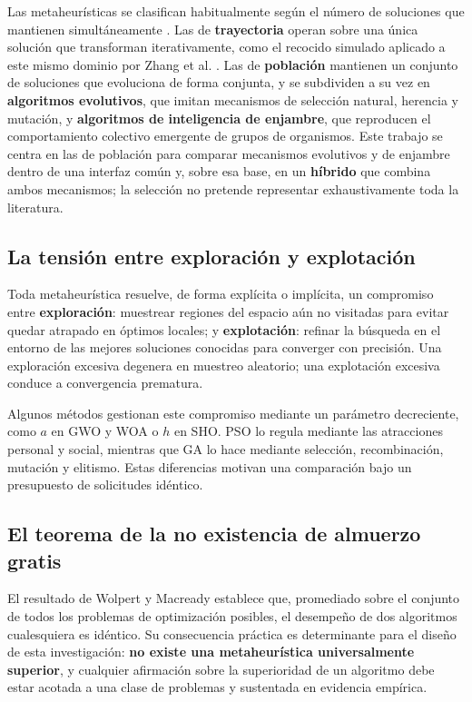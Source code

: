 Las metaheurísticas se clasifican habitualmente según el número de soluciones que mantienen simultáneamente \cite{Blum2003Overview,Talbi2009Metaheuristics}. Las de \textbf{trayectoria} operan sobre una única solución que transforman iterativamente, como el recocido simulado aplicado a este mismo dominio por Zhang et al. \cite{Zhang2018SA}. Las de \textbf{población} mantienen un conjunto de soluciones que evoluciona de forma conjunta, y se subdividen a su vez en \textbf{algoritmos evolutivos}, que imitan mecanismos de selección natural, herencia y mutación, y \textbf{algoritmos de inteligencia de enjambre}, que reproducen el comportamiento colectivo emergente de grupos de organismos. Este trabajo se centra en las de población para comparar mecanismos evolutivos y de enjambre dentro de una interfaz común y, sobre esa base, en un \textbf{híbrido} que combina ambos mecanismos; la selección no pretende representar exhaustivamente toda la literatura.

\subsection{La tensión entre exploración y explotación}

Toda metaheurística resuelve, de forma explícita o implícita, un compromiso entre \textbf{exploración}: muestrear regiones del espacio aún no visitadas para evitar quedar atrapado en óptimos locales; y \textbf{explotación}: refinar la búsqueda en el entorno de las mejores soluciones conocidas para converger con precisión. Una exploración excesiva degenera en muestreo aleatorio; una explotación excesiva conduce a convergencia prematura.

Algunos métodos gestionan este compromiso mediante un parámetro decreciente, como $a$ en GWO y WOA o $h$ en SHO. PSO lo regula mediante las atracciones personal y social, mientras que GA lo hace mediante selección, recombinación, mutación y elitismo. Estas diferencias motivan una comparación bajo un presupuesto de solicitudes idéntico.

\subsection{El teorema de la no existencia de almuerzo gratis}

El resultado de Wolpert y Macready \cite{Wolpert1997NFL} establece que, promediado sobre el conjunto de todos los problemas de optimización posibles, el desempeño de dos algoritmos cualesquiera es idéntico. Su consecuencia práctica es determinante para el diseño de esta investigación: \textbf{no existe una metaheurística universalmente superior}, y cualquier afirmación sobre la superioridad de un algoritmo debe estar acotada a una clase de problemas y sustentada en evidencia empírica.

